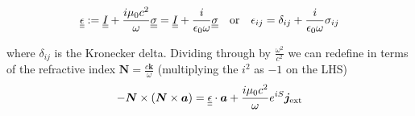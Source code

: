 \begin{equation}\label{cold_plasma_dielectric_tensor}
	\underline{\underline{\epsilon}} := \underline{\underline{I}} + \frac{i \mu_0 c^2}{\omega} \underline{\underline{\sigma}} = \underline{\underline{I}} + \frac{i}{\epsilon_0 \omega} \underline{\underline{\sigma}} \quad \text{or} \quad \epsilon_{ij} = \delta_{ij} + \frac{i}{\epsilon_0 \omega} \sigma_{ij}
\end{equation}

where $\delta_{ij}$ is the Kronecker delta. Dividing through by $\frac{\omega^2}{c^2}$ we can redefine in terms of the refractive index $\bm{N} = \frac{c \bm{k}}{\omega}$ (multiplying the $i^2$ as $-1$ on the LHS)
\begin{equation}
	-\bm{N} \times \left( \bm{N} \times \bm{a} \right) = \underline{\underline{\epsilon}} \cdot \bm{a} + \frac{i \mu_0 c^2}{\omega} e^{iS} \bm{j}_{\text{ext}}
\end{equation}

